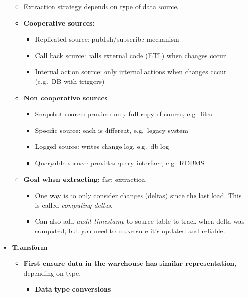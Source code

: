 \begin{multicols}{2}
\begin{itemize}
  \begin{itemize}
    \item
    Extraction strategy depends on type of data source.
  \item
    \textbf{Cooperative sources:}

    \begin{itemize}
        \item
      Replicated source: publish/subscribe mechanism
    \item
      Call back source: calls external code (ETL) when changes occur
    \item
      Internal action source: only internal actions when changes occur
      (e.g.~DB with triggers)
    \end{itemize}
  \item
    \textbf{Non-cooperative sources}

    \begin{itemize}
        \item
      Snapshot source: provices only full copy of source, e.g.~files
    \item
      Specific source: each is different, e.g.~legacy system
    \item
      Logged source: writes change log, e.g.~db log
    \item
      Queryable soruce: provides query interface, e.g.~RDBMS
    \end{itemize}
  \item
    \textbf{Goal when extracting:} fast extraction.

    \begin{itemize}
        \item
      One way is to only consider changes (deltas) since the last load.
      This is called \emph{computing deltas}.
    \item
      Can also add \emph{audit timestamp} to source table to track when
      delta was computed, but you need to make sure it's updated and
      reliable.
    \end{itemize}
  \end{itemize}
\item
  \textbf{Transform}

  \begin{itemize}
    \item
    \textbf{First ensure data in the warehouse has similar
    representation}, depending on type.

    \begin{itemize}
        \item
      \textbf{Data type conversions}


\end{itemize}
\end{itemize}
\end{itemize}
\end{multicols}
